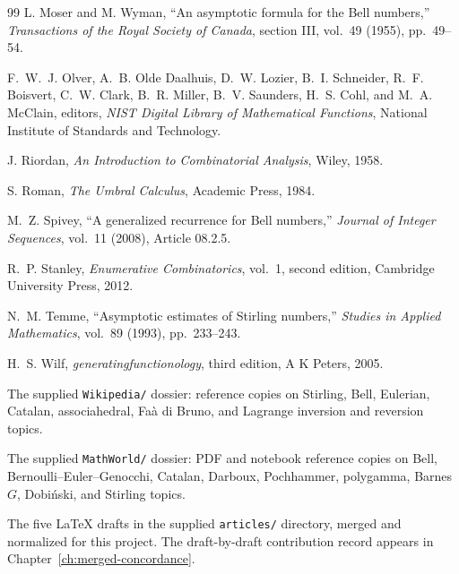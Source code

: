 \documentclass[11pt,a4paper,oneside,openany]{book}
\theoremstyle{definition}
\theoremstyle{remark}
\begin{document}
\begin{thebibliography}{99}
L. Moser and M. Wyman,
``An asymptotic formula for the Bell numbers,''
\emph{Transactions of the Royal Society of Canada}, section III, vol.~49
(1955), pp.~49--54.

F.~W.~J. Olver, A.~B. Olde Daalhuis, D.~W. Lozier, B.~I. Schneider,
R.~F. Boisvert, C.~W. Clark, B.~R. Miller, B.~V. Saunders,
H.~S. Cohl, and M.~A. McClain, editors,
\emph{NIST Digital Library of Mathematical Functions},
National Institute of Standards and Technology.

J. Riordan,
\emph{An Introduction to Combinatorial Analysis},
Wiley, 1958.

S. Roman,
\emph{The Umbral Calculus},
Academic Press, 1984.

M.~Z. Spivey,
``A generalized recurrence for Bell numbers,''
\emph{Journal of Integer Sequences}, vol.~11 (2008), Article 08.2.5.

R.~P. Stanley,
\emph{Enumerative Combinatorics}, vol.~1, second edition,
Cambridge University Press, 2012.

N.~M. Temme,
``Asymptotic estimates of Stirling numbers,''
\emph{Studies in Applied Mathematics}, vol.~89 (1993), pp.~233--243.

H.~S. Wilf,
\emph{generatingfunctionology}, third edition,
A K Peters, 2005.

The supplied \nolinkurl{Wikipedia/} dossier: reference copies on Stirling,
Bell, Eulerian, Catalan, associahedral, Fa\`a di Bruno, and Lagrange inversion
and reversion topics.

The supplied \nolinkurl{MathWorld/} dossier: PDF and notebook reference copies
on Bell, Bernoulli--Euler--Genocchi, Catalan, Darboux, Pochhammer, polygamma,
Barnes $G$, Dobi\'nski, and Stirling topics.

The five LaTeX drafts in the supplied \nolinkurl{articles/} directory, merged and
normalized for this project.  The draft-by-draft contribution record appears in
Chapter~\ref{ch:merged-concordance}.

\end{thebibliography}

\printindex
\end{document}
